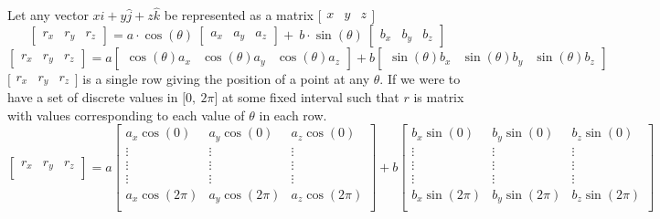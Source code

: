\documentclass[a4paper]{article}
\begin{document}
Let any vector \(x\hat{i} + y \hat{j} + z\hat{k}\) be
represented as a matrix \(\big[\begin{matrix}x & y & z \end{matrix}\big]\)
\[\begin{bmatrix}r_{x} & r_{y} & r_{z}\end{bmatrix} = a \cdot \cos(\theta)\ 
\begin{bmatrix}a_{x} & a_{y} & a_{z} \end{bmatrix} + \ b \cdot \sin(\theta)\
\begin{bmatrix}b_{x} & b_{y} & b_{z}\end{bmatrix}\]
\[\begin{bmatrix}r_{x} & r_{y} & r_{z}\end{bmatrix} = a
\begin{bmatrix}\cos(\theta)a_{x} & \cos(\theta)a_{y} & \cos(\theta)a_{z}\end{bmatrix} + b
\begin{bmatrix}\sin(\theta)b_{x} & \sin(\theta)b_{y} & \sin(\theta)b_{z}\end{bmatrix}\]
\(\big[\begin{matrix}r_{x} & r_{y} & r_{z}\end{matrix}\big]\) is a single row giving the position of a point at any
\(\theta\). If we were to have a set of discrete values in
\(\lbrack 0,\ 2\pi\rbrack\) at some fixed interval such that \(r\) is
matrix with values corresponding to each value of \(\theta\) in each
row.
\[\begin{bmatrix}
r_{x} & r_{y} & r_{z} \\
\end{bmatrix} = a\begin{bmatrix}
a_{x}\cos(0) & a_{y}\cos(0) & a_{z}\cos(0) \\
 \vdots & \vdots & \vdots \\
 \vdots & \vdots & \vdots \\
 \vdots & \vdots & \vdots \\
a_{x}\cos(2\pi) & a_{y}\cos(2\pi) & a_{z}\cos(2\pi) \\
\end{bmatrix} + b\begin{bmatrix}
b_{x}\sin(0) & b_{y}\sin(0) & b_{z}\sin(0) \\
 \vdots & \vdots & \vdots \\
 \vdots & \vdots & \vdots \\
 \vdots & \vdots & \vdots \\
b_{x}\sin(2\pi) & b_{y}\sin(2\pi) & b_{z}\sin(2\pi) \\
\end{bmatrix}\]
\end{document}
